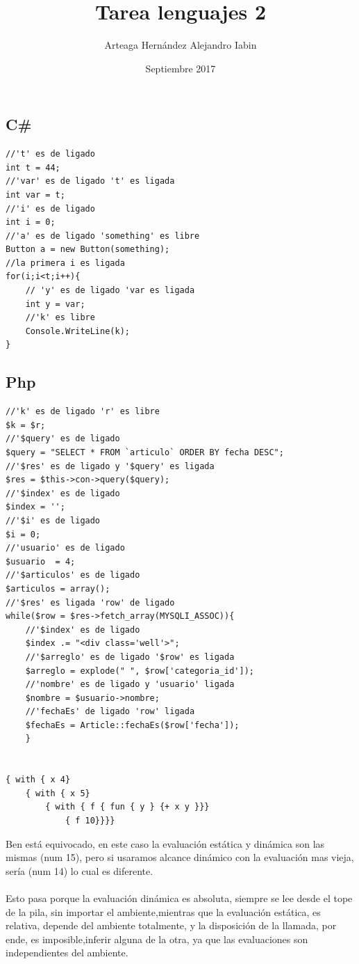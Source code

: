 \documentclass{article}
\title{Tarea lenguajes 2}
\author{Arteaga Hernández Alejandro Iabin}
\date{Septiembre 2017}
\begin{document}
\maketitle

\section{}
\subsection{C\#}
\begin{verbatim}
//'t' es de ligado
int t = 44;
//'var' es de ligado 't' es ligada
int var = t;
//'i' es de ligado 
int i = 0;
//'a' es de ligado 'something' es libre
Button a = new Button(something);
//la primera i es ligada 
for(i;i<t;i++){
    // 'y' es de ligado 'var es ligada
    int y = var;
    //'k' es libre
    Console.WriteLine(k);
}
\end{verbatim}
\subsection{Php}
\begin{verbatim}
//'k' es de ligado 'r' es libre
$k = $r;
//'$query' es de ligado
$query = "SELECT * FROM `articulo` ORDER BY fecha DESC";
//'$res' es de ligado y '$query' es ligada
$res = $this->con->query($query);
//'$index' es de ligado
$index = '';
//'$i' es de ligado
$i = 0;
//'usuario' es de ligado 
$usuario  = 4;
//'$articulos' es de ligado 
$articulos = array();
//'$res' es ligada 'row' de ligado
while($row = $res->fetch_array(MYSQLI_ASSOC)){
    //'$index' es de ligado
    $index .= "<div class='well'>";
    //'$arreglo' es de ligado '$row' es ligada
    $arreglo = explode(" ", $row['categoria_id']);
    //'nombre' es de ligado y 'usuario' ligada
    $nombre = $usuario->nombre;
    //'fechaEs' de ligado 'row' ligada
    $fechaEs = Article::fechaEs($row['fecha']);
    }
\end{verbatim}

\section{}
\begin{verbatim}
{ with { x 4}
    { with { x 5}
        { with { f { fun { y } {+ x y }}}
            { f 10}}}}
\end{verbatim}
Ben está equivocado, en este caso la evaluación estática y dinámica son las mismas (num 15), 
pero si usaramos alcance dinámico con la evaluación mas vieja, sería (num 14) lo cual es diferente.\\\\
    Esto pasa porque la evaluación dinámica es absoluta, siempre se lee desde el tope de la pila, sin importar el ambiente,mientras que
la evaluación estática, es relativa, depende del ambiente totalmente, y la disposición de la llamada, por ende, es imposible,inferir alguna de la otra, ya que las evaluaciones 
son independientes del ambiente.
\end{document}

